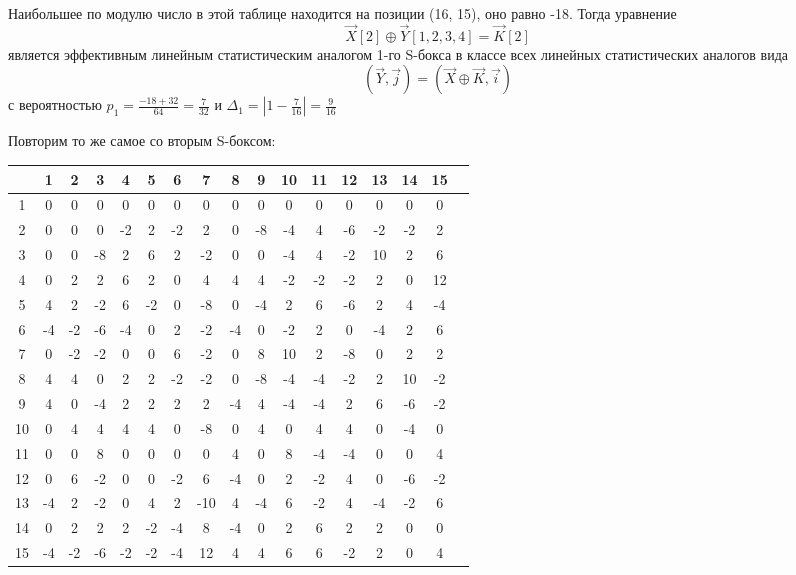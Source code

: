 \medskip

Наибольшее по модулю число в этой таблице находится на позиции (16, 15), оно равно -18. Тогда уравнение
$$\vec{X}[2] \oplus \vec{Y}[1, 2, 3, 4] = \vec{K}[2]$$
является эффективным линейным статистическим аналогом 1-го S-бокса в классе всех линейных статистических аналогов вида
$$(\vec{Y}, \vec{j}) = (\vec{X} \oplus \vec{K}, \vec{i})$$
с вероятностью $p_1 = \frac{-18 + 32}{64} = \frac{7}{32}$ и $\Delta_1= |1 - \frac{7}{16}| = \frac{9}{16}$

Повторим то же самое со вторым S-боксом:

\begin{tabular}{c||c|c|c|c|c|c|c|c|c|c|c|c|c|c|c|c}
    & 1 & 2 & 3 & 4 & 5 & 6 & 7 & 8 & 9 & 10 & 11 & 12 & 13 & 14 & 15 \\
    \hline
    \hline
    1 & 0 & 0 & 0 & 0 & 0 & 0 & 0 & 0 & 0 & 0 & 0 & 0 & 0 & 0 & 0 \\
    \hline
2 & 0 & 0 & 0 & -2 & 2 & -2 & 2 & 0 & -8 & -4 & 4 & -6 & -2 & -2 & 2 \\
\hline
3 & 0 & 0 & -8 & 2 & 6 & 2 & -2 & 0 & 0 & -4 & 4 & -2 & 10 & 2 & 6 \\
\hline
4 & 0 & 2 & 2 & 6 & 2 & 0 & 4 & 4 & 4 & -2 & -2 & -2 & 2 & 0 & 12 \\
\hline
5 & 4 & 2 & -2 & 6 & -2 & 0 & -8 & 0 & -4 & 2 & 6 & -6 & 2 & 4 & -4 \\
\hline
6 & -4 & -2 & -6 & -4 & 0 & 2 & -2 & -4 & 0 & -2 & 2 & 0 & -4 & 2 & 6 \\
\hline
7 & 0 & -2 & -2 & 0 & 0 & 6 & -2 & 0 & 8 & 10 & 2 & -8 & 0 & 2 & 2 \\
\hline
8 & 4 & 4 & 0 & 2 & 2 & -2 & -2 & 0 & -8 & -4 & -4 & -2 & 2 & 10 & -2 \\
\hline
9 & 4 & 0 & -4 & 2 & 2 & 2 & 2 & -4 & 4 & -4 & -4 & 2 & 6 & -6 & -2 \\
\hline
10 & 0 & 4 & 4 & 4 & 4 & 0 & -8 & 0 & 4 & 0 & 4 & 4 & 0 & -4 & 0 \\
\hline
11 & 0 & 0 & 8 & 0 & 0 & 0 & 0 & 4 & 0 & 8 & -4 & -4 & 0 & 0 & 4 \\
\hline
12 & 0 & 6 & -2 & 0 & 0 & -2 & 6 & -4 & 0 & 2 & -2 & 4 & 0 & -6 & -2 \\
\hline
13 & -4 & 2 & -2 & 0 & 4 & 2 & -10 & 4 & -4 & 6 & -2 & 4 & -4 & -2 & 6 \\
\hline
14 & 0 & 2 & 2 & 2 & -2 & -4 & 8 & -4 & 0 & 2 & 6 & 2 & 2 & 0 & 0 \\
\hline
15 & -4 & -2 & -6 & -2 & -2 & -4 & 12 & 4 & 4 & 6 & 6 & -2 & 2 & 0 & 4 \\

\end{tabular}
